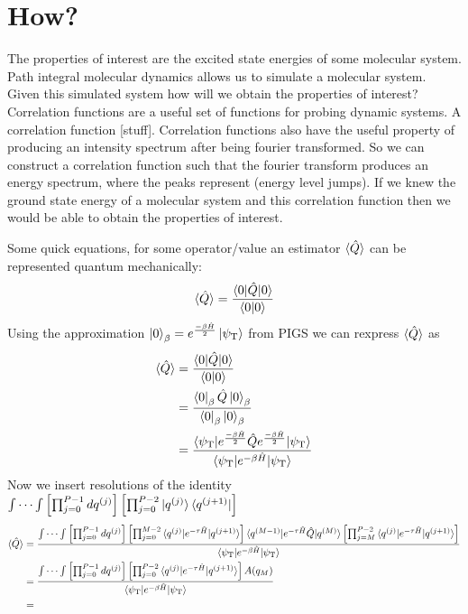 \documentclass[12pt,letterpaper,oneside,final,titlepage]{article}               %
\numberwithin{equation}{section} %
\newcommand{\psiT}{\psi_{\textrm{T}}}
\begin{document}
\newpage

\section{How?}
The properties of interest are the excited state energies of some molecular system. 
Path integral molecular dynamics allows us to simulate a molecular system. 
Given this simulated system how will we obtain the properties of interest?
Correlation functions are a useful set of functions for probing dynamic systems.
A correlation function [stuff].
Correlation functions also have the useful property of producing an intensity spectrum after being fourier transformed.
So we can construct a correlation function such that the fourier transform produces an energy spectrum, where the peaks
represent (energy level jumps).
If we knew the ground state energy of a molecular system and this correlation function then we would be able to obtain the properties of interest.

Some quick equations, for some operator/value an estimator $\braket{\hat{Q}}$ can be represented quantum mechanically:
\begin{equation}
    \braket{\hat{Q}} = \frac{\braket{0|\hat{Q}|0}}{\braket{0|0}}
\end{equation}
Using the approximation $\ket{0}_{\beta} = e^{\frac{-\beta\hat{H}}{2}}\ket{\psiT}$ 
from PIGS we can rexpress $\braket{\hat{Q}}$ as
\begin{align}
	\braket{\hat{Q}} 
	    &= \frac{\braket{0|\hat{Q}|0}}{\braket{0|0}} 
	\\	&= \frac{\bra{0}_{\beta}\hat{Q}\ket{0}_{\beta}}{\bra{0}_{\beta}\ket{0}_{\beta}}
	\\	&= \frac{\braket{\psiT|e^{\frac{-\beta\hat{H}}{2}}\hat{Q}e^{\frac{-\beta\hat{H}}{2}}|\psiT}}
				{\braket{\psiT|e^{ -\beta\hat{H}}|\psiT}} 
\end{align}
Now we insert resolutions of the identity 
$\int\cdots\int\left[\prod_{j=0}^{P-1}dq^{(j)}\right]\left[\prod_{j=0}^{P-2}\ket{q^{(j)}}\bra{q^{(j+1)}}\right]$
\begin{align}
	\braket{\hat{Q}} 
		&=\frac{\int\cdots\int\left[\prod_{j=0}^{P-1}dq^{(j)}\right]
				\left[\prod_{j=0}^{M-2}\braket{q^{(j)}|e^{-\tau\hat{H}}|q^{(j+1)}}\right]
				\braket{q^{(M-1)}|e^{-\tau\hat{H}}\hat{Q}|q^{(M)}}
				\left[\prod_{j=M}^{P-2}\braket{q^{(j)}|e^{-\tau\hat{H}}|q^{(j+1)}}\right]
				}
			   {\braket{\psiT|e^{ -\beta\hat{H}}|\psiT}}
	\\  &=\frac{\int\cdots\int\left[\prod_{j=0}^{P-1}dq^{(j)}\right]
				\left[\prod_{j=0}^{P-2}\braket{q^{(j)}|e^{-\tau\hat{H}}|q^{(j+1)}}\right]
				A(q_{M})
				}
			   {\braket{\psiT|e^{ -\beta\hat{H}}|\psiT}}
	\\	&=
\end{align}
\end{document}
